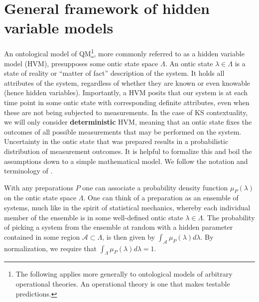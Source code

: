 \section{General framework of hidden variable models}
\label{sec:hvm}
An ontological model of QM\footnote{The following applies more generally to ontological models of arbitrary operational theories. An operational theory is one that makes testable predictions.}, more commonly referred to as a hidden variable model (HVM), presupposes some ontic state space $\Lambda$. An ontic state $\lambda\in\Lambda$ is a state of reality or “matter of fact” description of the system. It holds all attributes of the system, regardless of whether they are known or even knowable (hence hidden variables). Importantly, a HVM posits that our system is at each time point in some ontic state with corresponding definite attributes, even when these are not being subjected to measurements. In the case of KS contextuality, we will only consider \textbf{deterministic} HVM, meaning that an ontic state fixes the outcomes of all possible measurements that may be performed on the system. Uncertainty in the ontic state that was prepared results in a probabilistic distribution of measurement outcomes. It is helpful to formalize this and boil the assumptions down to a simple mathematical model. We follow the notation and terminology of \cite{Spekkens2005}.

With any preparations $P$ one can associate a probability density function $\mu_{P}(\lambda)$ on the ontic state space $\Lambda$. One can think of a preparation as an ensemble of systems, much like in the spirit of statistical mechanics, whereby each individual member of the ensemble is in some well-defined ontic state $\lambda\in\Lambda$. The probability of picking a system from the ensemble at random with a hidden parameter contained in some region $\mathcal{A}\subset\Lambda$, is then given by $\int_{\mathcal{A}}\mu_{P}(\lambda)d\lambda$. By normalization, we require that $\int_{\Lambda}\mu_{P}(\lambda)d\lambda=1$.

